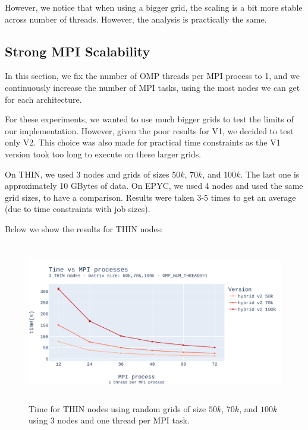 \documentclass{report}
\begin{document}
However, we notice that when using a bigger grid, the scaling is a bit more stable 
across number of threads. However, the analysis is practically the same.

\subsection{Strong MPI Scalability}

In this section, we fix the number of OMP threads per MPI process to 1, and we 
continuously increase the number of MPI tasks, using the most nodes we can get 
for each architecture. 

For these experiments, we wanted to use much bigger grids to test the limits 
of our implementation. However, given the poor results for V1, we 
decided to test only V2. This choice was also made for practical time 
constraints as the V1 version took too long to execute on these larger grids. 

On THIN, we used 3 nodes and grids of sizes $50k$, $70k$, and $100k$. The last 
one is approximately 10 GBytes of data. On EPYC, we used 4 nodes and used the 
same grid sizes, to have a comparison. Results were taken 3-5 times to get an 
average (due to time constraints with job sizes).

Below we show the results for THIN nodes:

\begin{figure}[H]
\centering
\includegraphics[width=14cm, height=7cm]{./images/strong_MPI_thin_hybrid.pdf}
\caption{\label{fig:strongmpithinhybrid} Time for THIN nodes using random grids 
of size $50k$, $70k$, and $100k$ using 3 nodes and one thread per MPI task. }
\end{figure}
\end{document}
